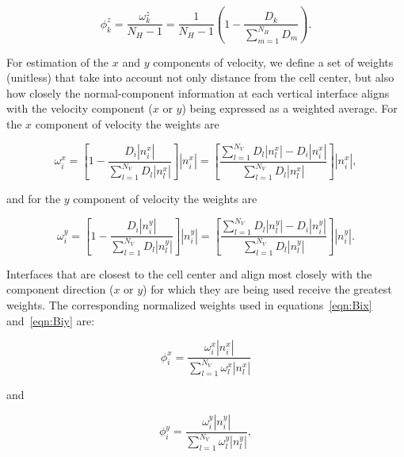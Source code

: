 \begin{equation}
\label{eqn:phiz}
\phi_k^z = \frac{\omega_k^z}{{N_H} - 1} = \frac{1}{{N_H} - 1} \left (1 - \frac{D_k}{\sum_{m=1}^{N_H} D_m} \right ).
\end{equation}

For estimation of the $x$ and $y$ components of velocity, we define a set of weights (unitless) that take into account not only distance from the cell center, but also how closely the normal-component information at each vertical interface aligns with the velocity component ($x$ or $y$) being expressed as a weighted average. For the $x$ component of velocity the weights are

\begin{equation}
\label{eqn:omegax}
\omega_i^x = \left [ 1 - \frac{D_i \left | n_i^x \right | }{\sum_{l=1}^{N_V}{} D_l  \left | n_l^x \right | } \right ] \left | n_i^x \right | = \left [ \frac{\sum_{l=1}^{N_V} D_l  \left | n_l^x \right |  - D_i \left | n_i^x \right | }{\sum_{l=1}^{N_V} D_l  \left | n_l^x \right | } \right ] \left | n_i^x \right |,
\end{equation}

\noindent and for the $y$ component of velocity the weights are

\begin{equation}
\label{eqn:omegay}
\omega_i^y = \left [ 1 - \frac{D_i \left | n_i^y \right | }{\sum_{l=1}^{N_V} D_l  \left | n_l^y \right | } \right ] \left | n_i^y \right | = \left [ \frac{\sum_{l=1}^{N_V} D_l  \left | n_l^y \right | - D_i \left | n_i^y \right | }{\sum_{l=1}^{N_V} D_l  \left | n_l^y \right | } \right ] \left | n_i^y \right |.
\end{equation}

\noindent Interfaces that are closest to the cell center and align most closely with the component direction ($x$ or $y$) for which they are being used receive the greatest weights. The corresponding normalized weights used in equations~\ref{eqn:Bix} and~\ref{eqn:Biy} are:

\begin{equation}
\label{eqn:phix}
\phi_i^x =  \frac{\omega_i^x \left | n_i^x \right | }{\sum_{l=1}^{N_V} \omega_l^x  \left | n_l^x \right | }
\end{equation}

\noindent and

\begin{equation}
\label{eqn:phiy}
\phi_i^y =  \frac{\omega_i^y \left | n_i^y \right | }{\sum_{l=1}^{N_V} \omega_l^y  \left | n_l^y \right | } ,
\end{equation}

